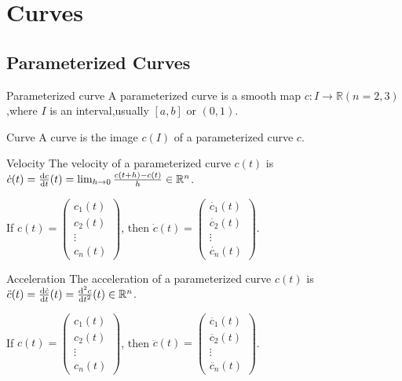 \chapter{Curves}

\section{Parameterized Curves}

\begin{definition}{Parameterized curve}
    A parameterized curve is a smooth map $c:I\to\mathbb{R}(n=2,3)$,where $I$ is an interval,usually $[a,b]$ or $(0,1)$.
\end{definition}



\begin{definition}{Curve}
    A curve is the image $c(I)$ of a parameterized curve $c$.
\end{definition}

\begin{definition}{Velocity}
    The velocity of a parameterized curve $c(t)$ is $\dot{c}(t)=\frac{\mathrm{d} c}{\mathrm{d} t}(t)=\lim_{h\to 0}{\frac{c(t+h)-c(t)}{h}}\in\mathbb{R}^n$.\par


    If  $c(t)=\begin{pmatrix}
        c_1(t) \\ c_2(t) \\ \vdots \\ c_n(t)
    \end{pmatrix}$, then $\dot{c}(t)=\begin{pmatrix}
        \dot{c_1}(t) \\ \dot{c_2}(t) \\ \vdots \\\dot{c_n}(t)
    \end{pmatrix}$.
\end{definition}

\begin{definition}{Acceleration}
    The acceleration of a parameterized curve $c(t)$ is $\ddot{c}(t)=\frac{\mathrm{d}\dot{c}}{\mathrm{d} t}(t)=\frac{\mathrm{d}^2c}{\mathrm{d} t^2}(t)\in\mathbb{R}^n$.\par
    If  $c(t)=\begin{pmatrix}
        c_1(t) \\ c_2(t) \\ \vdots \\ c_n(t)
    \end{pmatrix}$, then $\ddot{c}(t)=\begin{pmatrix}
        \ddot{c_1}(t) \\ \ddot{c_2}(t) \\ \vdots \\\ddot{c_n}(t)
    \end{pmatrix}$.
\end{definition}


